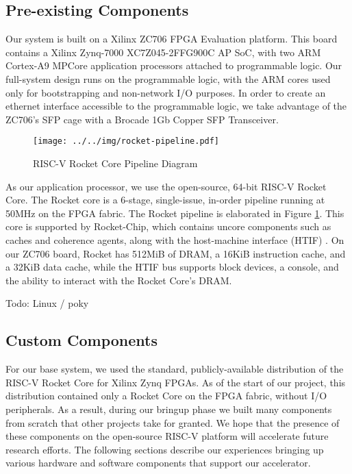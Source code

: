 \subsection{Pre-existing Components}
    Our system is built on a Xilinx ZC706 FPGA Evaluation platform. This board
    contains a Xilinx Zynq-7000 XC7Z045-2FFG900C AP SoC, with two ARM Cortex-A9
    MPCore application processors attached to programmable logic. Our full-system
    design runs on the programmable logic, with the ARM cores used only for 
    bootstrapping and non-network I/O purposes. In order to create an ethernet interface accessible
    to the programmable logic, we take advantage of the ZC706's SFP cage with a 
    Brocade 1Gb Copper SFP Transceiver.

    
\begin{figure}[t]
\begin{center}
\label{fig:rocketpipe}
\texttt{[image: ../../img/rocket-pipeline.pdf]}
\caption{RISC-V Rocket Core Pipeline Diagram}
\end{center}
\end{figure}


    As our application processor, we use the open-source, 64-bit RISC-V Rocket Core. 
    The Rocket core is a
    6-stage, single-issue, in-order pipeline running at 50MHz on the FPGA fabric. The
    Rocket pipeline is elaborated in Figure \ref{fig:rocketpipe}. This 
    core is supported by Rocket-Chip, which contains uncore components such as
    caches and coherence agents, along with the host-machine interface (HTIF) \cite{rocket}.
    On our ZC706 board, Rocket has 512MiB of DRAM, a 16KiB instruction cache, and a 
    32KiB data cache, while the HTIF bus supports block devices, a console, and 
    the ability to interact with the Rocket Core's DRAM.

Todo: Linux / poky



\subsection{Custom Components}
    For our base system, we used the standard, publicly-available 
    distribution of the RISC-V Rocket Core for Xilinx Zynq FPGAs. As of the 
    start of our project, this distribution contained only a Rocket Core on
    the FPGA fabric, without I/O peripherals. As a result, during our bringup phase 
    we built many components from scratch that other projects take for granted. We hope that
    the presence of these components on the open-source RISC-V platform
    will accelerate future research efforts. The following sections describe our
    experiences bringing up various hardware and software components that support
    our accelerator.

